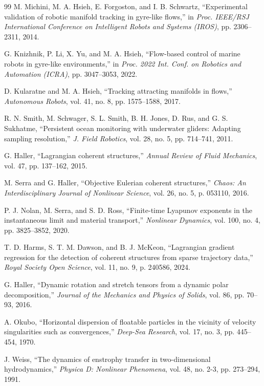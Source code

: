 \documentclass[lettersize,journal]{IEEEtran}
\begin{document}
\begin{thebibliography}{99}
 M. Michini, M. A. Hsieh, E. Forgoston, and I. B. Schwartz,
``Experimental validation of robotic manifold tracking in gyre-like flows,''
in \textit{Proc. IEEE/RSJ International Conference on Intelligent Robots
and Systems (IROS)}, pp. 2306--2311, 2014.

 G. Knizhnik, P. Li, X. Yu, and M. A. Hsieh, ``Flow-based control
of marine robots in gyre-like environments,'' in \textit{Proc. 2022 Int. Conf.
on Robotics and Automation (ICRA)}, pp. 3047--3053, 2022.

 D. Kularatne and M. A. Hsieh, ``Tracking attracting manifolds in
flows,'' \textit{Autonomous Robots}, vol. 41, no. 8, pp. 1575--1588, 2017.

 R. N. Smith, M. Schwager, S. L. Smith, B. H. Jones, D. Rus,
and G. S. Sukhatme, ``Persistent ocean monitoring with underwater gliders:
Adapting sampling resolution,'' \textit{J. Field Robotics}, vol. 28, no. 5,
pp. 714--741, 2011.

 G. Haller, ``Lagrangian coherent structures,'' \textit{Annual
Review of Fluid Mechanics}, vol. 47, pp. 137--162, 2015.

 M. Serra and G. Haller, ``Objective Eulerian coherent
structures,'' \textit{Chaos: An Interdisciplinary Journal of Nonlinear
Science}, vol. 26, no. 5, p. 053110, 2016.

 P. J. Nolan, M. Serra, and S. D. Ross, ``Finite-time Lyapunov
exponents in the instantaneous limit and material transport,''
\textit{Nonlinear Dynamics}, vol. 100, no. 4, pp. 3825--3852, 2020.

 T. D. Harms, S. T. M. Dawson, and B. J. McKeon, ``Lagrangian
gradient regression for the detection of coherent structures from sparse
trajectory data,'' \textit{Royal Society Open Science}, vol. 11, no. 9,
p. 240586, 2024.

 G. Haller, ``Dynamic rotation and stretch tensors from a
dynamic polar decomposition,'' \textit{Journal of the Mechanics and Physics
of Solids}, vol. 86, pp. 70--93, 2016.

 A. Okubo, ``Horizontal dispersion of floatable particles in the
vicinity of velocity singularities such as convergences,'' \textit{Deep-Sea
Research}, vol. 17, no. 3, pp. 445--454, 1970.

 J. Weiss, ``The dynamics of enstrophy transfer in two-dimensional
hydrodynamics,'' \textit{Physica D: Nonlinear Phenomena}, vol. 48, no. 2-3,
pp. 273--294, 1991.


\end{thebibliography}
\end{document}
